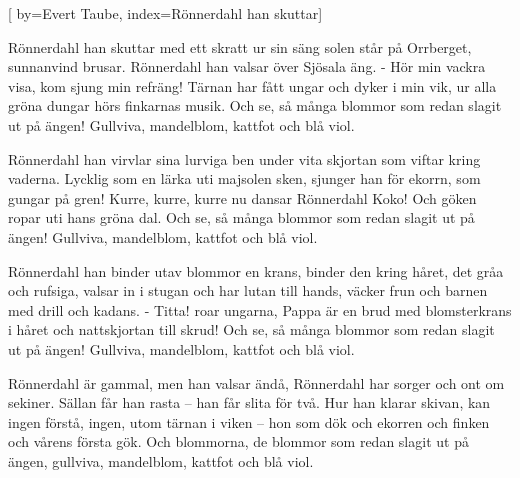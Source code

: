 


[ 	%
	by={Evert Taube},
	index={Rönnerdahl han skuttar}]		%
	
\beginverse*		%
Rönnerdahl han skuttar med ett skratt ur sin säng
solen står på Orrberget, sunnanvind brusar.
Rönnerdahl han valsar över Sjösala äng.
- Hör min vackra visa, kom sjung min refräng!
Tärnan har fått ungar
och dyker i min vik,
ur alla gröna dungar 
hörs finkarnas musik.
Och se, så många blommor
som redan slagit ut på ängen!
Gullviva, mandelblom, kattfot och blå viol.
\endverse			%

\beginverse*		%
Rönnerdahl han virvlar sina lurviga ben
under vita skjortan som
viftar kring vaderna.
Lycklig som en lärka uti majsolen sken,
sjunger han för ekorrn,
som gungar på gren!
Kurre, kurre, kurre
nu dansar Rönnerdahl
Koko! Och göken ropar
uti hans gröna dal.
Och se, så många blommor
som redan slagit ut på ängen!
Gullviva, mandelblom, kattfot och blå viol.
\endverse			%

\beginverse*		%
Rönnerdahl han binder utav blommor en krans,
binder den kring håret, det gråa och rufsiga,
valsar in i stugan och har lutan till hands,
väcker frun och barnen med drill och kadans.
- Titta! roar ungarna,
Pappa är en brud med blomsterkrans i håret
och nattskjortan till skrud!
Och se, så många blommor 
som redan slagit ut på ängen!
Gullviva, mandelblom, kattfot och blå viol.
\endverse			%

\beginverse*		%
Rönnerdahl är gammal,
men han valsar ändå,
Rönnerdahl har sorger och 
ont om sekiner.
Sällan får han rasta – han får slita för två.
Hur han klarar skivan, kan ingen förstå,
ingen, utom tärnan
i viken – hon som dök
och ekorren och finken 
och vårens första gök.
Och blommorna, de blommor
som redan slagit ut på ängen,
gullviva, mandelblom, kattfot och blå viol.
\endverse			%
\endsong			%
